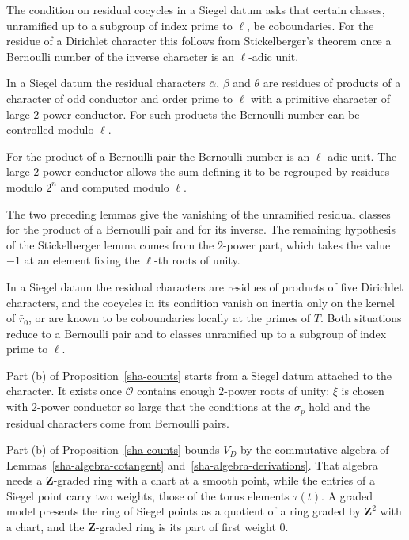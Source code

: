 The condition on residual cocycles in a Siegel datum asks that certain classes, unramified up to a subgroup of index prime to $\ell$, be coboundaries. For the residue of a Dirichlet character this follows from Stickelberger's theorem once a Bernoulli number of the inverse character is an $\ell$-adic unit.

In a Siegel datum the residual characters $\bar\alpha$, $\bar\beta$ and $\bar\theta$ are residues of products of a character of odd conductor and order prime to $\ell$ with a primitive character of large $2$-power conductor. For such products the Bernoulli number can be controlled modulo $\ell$.

For the product of a Bernoulli pair the Bernoulli number is an $\ell$-adic unit. The large $2$-power conductor allows the sum defining it to be regrouped by residues modulo $2^n$ and computed modulo $\ell$.

The two preceding lemmas give the vanishing of the unramified residual classes for the product of a Bernoulli pair and for its inverse. The remaining hypothesis of the Stickelberger lemma comes from the $2$-power part, which takes the value $-1$ at an element fixing the $\ell$-th roots of unity.

In a Siegel datum the residual characters are residues of products of five Dirichlet characters, and the cocycles in its condition vanish on inertia only on the kernel of $\bar r_0$, or are known to be coboundaries locally at the primes of $T$. Both situations reduce to a Bernoulli pair and to classes unramified up to a subgroup of index prime to $\ell$.

Part (b) of Proposition~\ref{sha-counts} starts from a Siegel datum attached to the character. It exists once $\mathcal O$ contains enough $2$-power roots of unity: $\xi$ is chosen with $2$-power conductor so large that the conditions at the $\sigma_p$ hold and the residual characters come from Bernoulli pairs.

Part (b) of Proposition~\ref{sha-counts} bounds $V_D$ by the commutative algebra of Lemmas~\ref{sha-algebra-cotangent} and~\ref{sha-algebra-derivations}. That algebra needs a $\mathbf Z$-graded ring with a chart at a smooth point, while the entries of a Siegel point carry two weights, those of the torus elements $\tau(t)$. A graded model presents the ring of Siegel points as a quotient of a ring graded by $\mathbf Z^2$ with a chart, and the $\mathbf Z$-graded ring is its part of first weight $0$.

